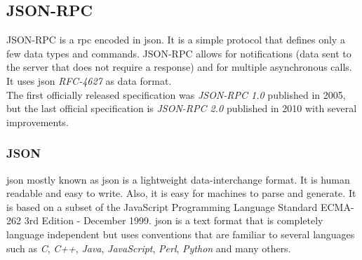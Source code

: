 \subsection{JSON-RPC}
JSON-RPC is a \acrfull{rpc} encoded in \acrshort{json}. It is a simple protocol that defines only a few data types and commands. JSON-RPC allows for notifications (data sent to the server that does not require a response) and for multiple asynchronous calls. It uses \acrshort{json} \textit{RFC-4627}\cite{rfc4627} as data format.\\

The first officially released specification was \textit{JSON-RPC 1.0}\cite{json-rpc-1} published in 2005, but the last official specification is \textit{JSON-RPC 2.0}\cite{json-rpc-2} published in 2010 with several improvements.

\subsubsection{JSON}
\acrlong{json} mostly known as \acrshort{json} is a lightweight data-interchange format. It is human readable and easy to write. Also, it is easy for machines to parse and generate. It is based on a subset of the JavaScript Programming Language Standard ECMA-262 3rd Edition - December 1999. \acrshort{json} is a text format that is completely language independent but uses conventions that are familiar to several languages such as \textit{C}, \textit{C++}, \textit{Java}, \textit{JavaScript}, \textit{Perl}, \textit{Python} and many others.\\

